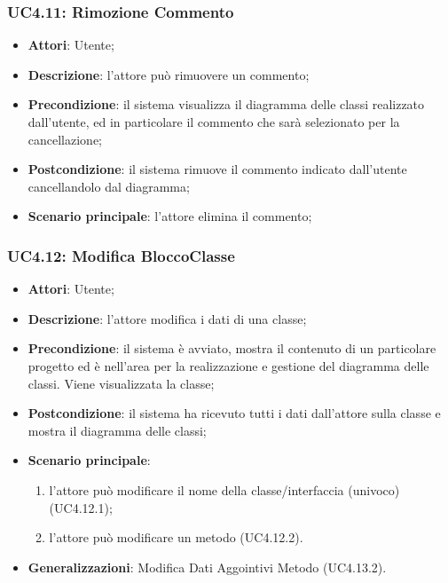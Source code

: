 \subsubsection{UC4.11: Rimozione Commento}
\label{UC4.11}
\begin{itemize}
	\item \textbf{Attori}: Utente;
	\item \textbf{Descrizione}: l'attore può rimuovere un commento;
	\item \textbf{Precondizione}: il sistema visualizza il diagramma delle classi realizzato dall'utente, ed in particolare il commento che sarà selezionato per la cancellazione;
	\item \textbf{Postcondizione}: il sistema rimuove il commento indicato dall'utente cancellandolo dal diagramma;
	\item \textbf{Scenario principale}: l'attore elimina il commento;
\end{itemize}

\subsubsection{UC4.12: Modifica BloccoClasse}
\label{UC4.12}
\begin{itemize}
	\item \textbf{Attori}: Utente;
	\item \textbf{Descrizione}: l'attore modifica i dati di una classe;
	\item \textbf{Precondizione}: il sistema è avviato, mostra il contenuto di un particolare progetto ed è nell'area per la realizzazione e gestione del diagramma delle classi. Viene visualizzata la classe;
	\item \textbf{Postcondizione}: il sistema ha ricevuto tutti i dati dall'attore sulla classe e mostra il diagramma delle classi;
	\item \textbf{Scenario principale}:
	\begin{enumerate}
		\item l'attore può modificare il nome della classe/interfaccia (univoco) (UC4.12.1);
		\item l'attore può modificare un metodo (UC4.12.2).
	\end{enumerate}
	\item \textbf{Generalizzazioni}: Modifica Dati Aggointivi Metodo (UC4.13.2).%
\end{itemize}

